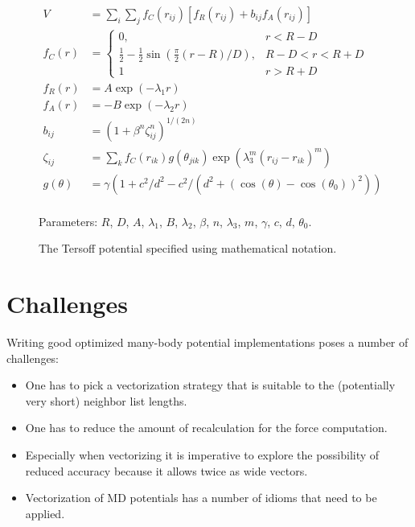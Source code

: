 \documentclass[sigconf]{acmart}
\begin{document}
%
%
%
%
%

\begin{figure}
\begin{align*}
V &= \sum_i\sum_j f_C(r_{ij}) [ f_R(r_{ij}) + b_{ij} f_A(r_{ij}) ]\\
f_C(r) &= \begin{cases}
  0, & r < R - D\\
  \frac{1}{2} - \frac{1}{2}\sin(\frac{\pi}{2} (r - R) / D), & R - D < r < R + D\\
  1 & r > R + D
\end{cases}\\
f_R(r) &= A\exp(-\lambda_1 r)\\
f_A(r) &= -B\exp(-\lambda_2 r)\\
b_{ij} &= (1 + \beta^n\zeta_{ij}^n)^{1/(2n)}\\
\zeta_{ij} &= \sum_k f_C(r_{ik}) g(\theta_{jik}) \exp(\lambda_3^m (r_{ij} - r_{ik})^m)\\
g(\theta) &= \gamma (1 + c^2/d^2 - c^2/(d^2 + (\cos(\theta) - \cos(\theta_0))^2))\\
\end{align*}


Parameters: $R$, $D$, $A$, $\lambda_1$, $B$, $\lambda_2$, $\beta$, $n$, $\lambda_3$, $m$, $\gamma$, $c$, $d$, $\theta_0$.
\caption{The Tersoff potential specified using mathematical notation.}\label{fig:ma-ters}
\end{figure}

\section{Challenges}

Writing good optimized many-body potential implementations poses a number of challenges:

\begin{itemize}
\item One has to pick a vectorization strategy that is suitable to the (potentially very short) neighbor list lengths.
\item One has to reduce the amount of recalculation for the force computation.
\item Especially when vectorizing it is imperative to explore the possibility of reduced accuracy because it allows twice as wide vectors.
\item Vectorization of MD potentials has a number of idioms that need to be applied.
\end{itemize}
\end{document}
